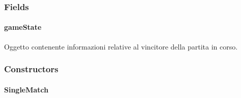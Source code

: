 \documentclass[letterpaper,10pt,italian,openany,oneside]{sphinxmanual}
\begin{document}
\subsubsection{Fields}
\label{\detokenize{source/it/unicam/cs/pa/mastermind/gamecore/SingleMatch:fields}}

\paragraph{gameState}
\label{\detokenize{source/it/unicam/cs/pa/mastermind/gamecore/SingleMatch:gamestate}}

\begin{fulllineitems}
\label{\detokenize{source/it/unicam/cs/pa/mastermind/gamecore/SingleMatch:it.unicam.cs.pa.mastermind.gamecore.SingleMatch.gameState}}
Oggetto contenente informazioni relative al vincitore della partita in corso.

\end{fulllineitems}



\subsubsection{Constructors}
\label{\detokenize{source/it/unicam/cs/pa/mastermind/gamecore/SingleMatch:constructors}}

\paragraph{SingleMatch}
\label{\detokenize{source/it/unicam/cs/pa/mastermind/gamecore/SingleMatch:id1}}
\end{document}
